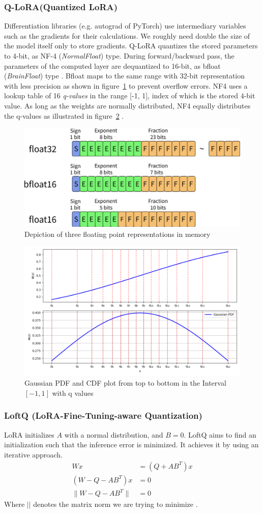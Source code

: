 \documentclass{article}
\begin{document}
\subsubsection{Q-LoRA(Quantized LoRA)}\label{qlora}
Differentiation libraries (e.g. autograd of PyTorch) use intermediary variables such as the gradients for their calculations. We roughly need double the size of the model itself only to store gradients. Q-LoRA quantizes the stored parameters to 4-bit, as NF-4 (\textit{NormalFloat}) type. During forward/backward pass, the parameters of the computed layer are dequantized to 16-bit, as bfloat (\textit{BrainFloat}) type \cite{dettmers_qlora_2023}. Bfloat maps to the same range with 32-bit representation with less precision as shown in figure~\ref{fig:bfloat} to prevent overflow errors. NF4 uses a lookup table of 16 \textit{q-values} in the range [-1, 1], index of which is the stored 4-bit value. As long as the weights are normally distributed, NF4 equally distributes the q-values  as illustrated in figure~\ref{fig:nf4} \cite{dettmers_8-bit_2022}.

\begin{figure}[H]
    \centering
    \includegraphics[width=0.5\linewidth]{pictures/bfloat.png}
    \caption{Depiction of three floating point representations in memory \cite{grobbelaar_pygmalionaipygmalion-7b_2023}}
    \label{fig:bfloat} 
\end{figure}

\begin{figure}[H]
    \centering
    \includegraphics[width=0.5\linewidth]{pictures/nf4.png}
    \caption{Gaussian PDF and CDF plot from top to bottom in the Interval $[-1, 1]$ with q values}
    \label{fig:nf4}
\end{figure}
\subsubsection{LoftQ (LoRA-Fine-Tuning-aware Quantization)}
LoRA initializes $A$ with a normal distribution, and $B=0$. LoftQ aims to find an initialization such that the inference error is minimized. It achieves it by using an iterative approach.
\begin{align}
    Wx &= (Q+AB^T)x\\
    (W-Q-AB^T)x &= 0\\
    \lVert W-Q-AB^T\rVert &= 0
\end{align}
Where $\vert\vert$ denotes the matrix norm we are trying to minimize \cite{li_loftq_2023}.
\end{document}

